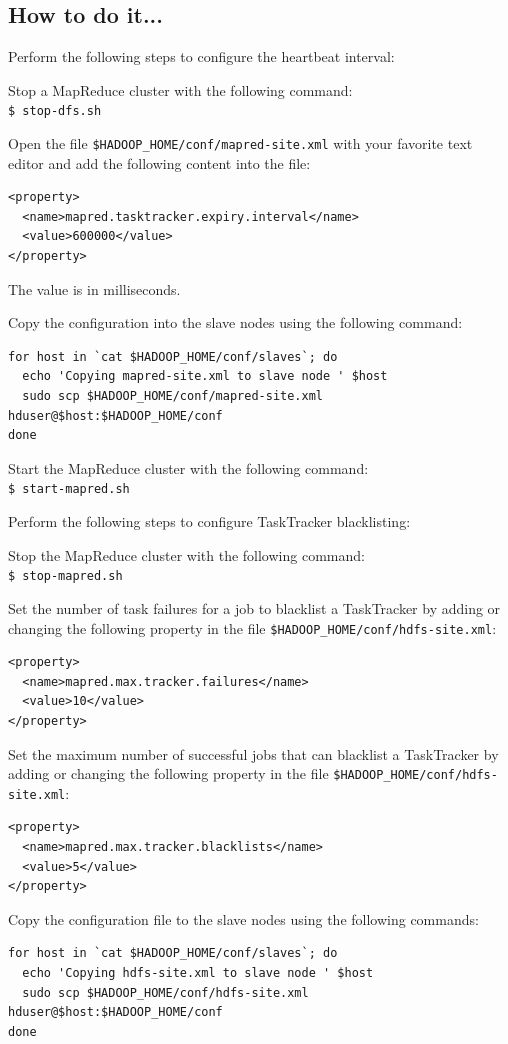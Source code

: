 \subsection*{How to do it...}
Perform the following steps to configure the heartbeat interval: 

Stop a MapReduce cluster with the following command:\\
\verb|$ stop-dfs.sh|

Open the file \verb|$HADOOP_HOME/conf/mapred-site.xml| with your favorite text editor and add the following content into the file:
\begin{verbatim} 
<property>
  <name>mapred.tasktracker.expiry.interval</name>
  <value>600000</value>
</property>
\end{verbatim}

The value is in milliseconds.

Copy the configuration into the slave nodes using the following command:
\begin{verbatim} 
for host in `cat $HADOOP_HOME/conf/slaves`; do
  echo 'Copying mapred-site.xml to slave node ' $host
  sudo scp $HADOOP_HOME/conf/mapred-site.xml hduser@$host:$HADOOP_HOME/conf
done
\end{verbatim}

Start the MapReduce cluster with the following command: \\
\verb|$ start-mapred.sh|

Perform the following steps to configure TaskTracker blacklisting:

Stop the MapReduce cluster with the following command: \\
\verb|$ stop-mapred.sh|

Set the number of task failures for a job to blacklist a TaskTracker by adding or changing the following property in the file \verb|$HADOOP_HOME/conf/hdfs-site.xml|:
\begin{verbatim} 
<property>
  <name>mapred.max.tracker.failures</name>
  <value>10</value>
</property>
\end{verbatim}

Set the maximum number of successful jobs that can blacklist a TaskTracker by adding or changing the following property in the file \verb|$HADOOP_HOME/conf/hdfs-site.xml|:
\begin{verbatim} 
<property>
  <name>mapred.max.tracker.blacklists</name>
  <value>5</value>
</property>
\end{verbatim}

Copy the configuration file to the slave nodes using the following commands:
\begin{verbatim} 
for host in `cat $HADOOP_HOME/conf/slaves`; do
  echo 'Copying hdfs-site.xml to slave node ' $host
  sudo scp $HADOOP_HOME/conf/hdfs-site.xml hduser@$host:$HADOOP_HOME/conf
done
\end{verbatim}


